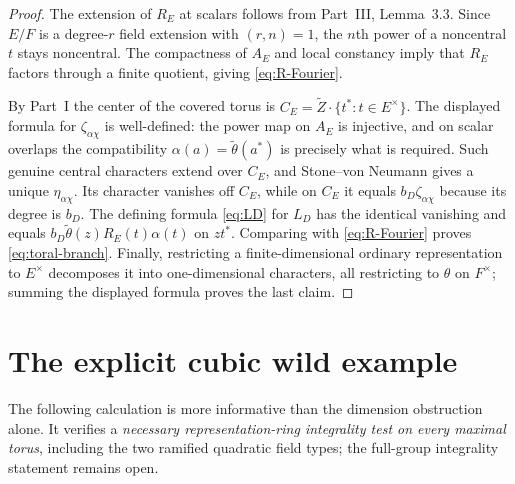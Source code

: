 \documentclass[11pt]{article}
\theoremstyle{plain}
\theoremstyle{definition}
\begin{document}
\begin{proof}
The extension of $R_E$ at scalars follows from Part~III,
Lemma~3.3.  Since $E/F$ is a degree-$r$ field extension with
$(r,n)=1$, the $n$th power of a noncentral $t$ stays noncentral.
The compactness of $A_E$ and local constancy imply that $R_E$
factors through a finite quotient, giving \eqref{eq:R-Fourier}.

By Part~I the center of the covered torus is
$C_E=\widetilde Z\cdot\{t^*:t\in E^\times\}$.  The displayed
formula for $\zeta_{\alpha\chi}$ is well-defined: the
power map on $A_E$ is injective, and on scalar overlaps the
compatibility $\alpha(a)=\widetilde\theta(a^*)$ is precisely
what is required.  Such genuine central characters extend over
$C_E$, and Stone--von Neumann gives a unique $\eta_{\alpha\chi}$.
Its character vanishes off $C_E$, while on $C_E$ it equals
$b_D\zeta_{\alpha\chi}$ because its degree is $b_D$.
The defining formula \eqref{eq:LD} for $L_D$ has the identical
vanishing and equals $b_D\widetilde\theta(z)R_E(t)\alpha(t)$
on $z t^*$.  Comparing with \eqref{eq:R-Fourier} proves
\eqref{eq:toral-branch}.  Finally, restricting a finite-dimensional
ordinary representation to $E^\times$ decomposes it into
one-dimensional characters, all restricting to $\theta$ on
$F^\times$; summing the displayed formula proves the last claim.
\end{proof}


\section{The explicit cubic wild example}\label{sec:examplewild}
\label{subsec:examplewild}
The following calculation is more informative than the dimension
obstruction alone.  It verifies a \emph{necessary representation-ring
integrality test on every maximal torus}, including the two ramified
quadratic field types; the full-group integrality statement remains open.
\end{document}
